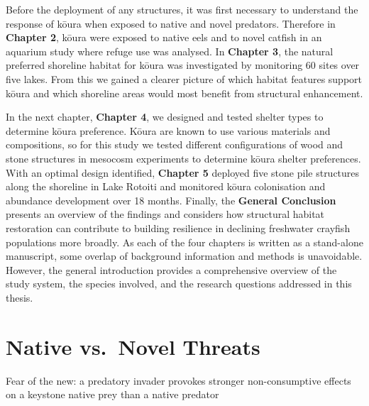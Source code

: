 \documentclass[
  12pt,
  a4paper,
  oneside]{scrbook}
\begin{document}
Before the deployment of any structures, it was first necessary to
understand the response of kōura when exposed to native and novel
predators. Therefore in \textbf{Chapter 2}, kōura were exposed to native
eels and to novel catfish in an aquarium study where refuge use was
analysed. In \textbf{Chapter 3}, the natural preferred shoreline habitat
for kōura was investigated by monitoring 60 sites over five lakes. From
this we gained a clearer picture of which habitat features support kōura
and which shoreline areas would most benefit from structural
enhancement.

In the next chapter, \textbf{Chapter 4}, we designed and tested shelter
types to determine kōura preference. Kōura are known to use various
materials and compositions, so for this study we tested different
configurations of wood and stone structures in mesocosm experiments to
determine kōura shelter preferences. With an optimal design identified,
\textbf{Chapter 5} deployed five stone pile structures along the
shoreline in Lake Rotoiti and monitored kōura colonisation and abundance
development over 18 months. Finally, the \textbf{General Conclusion}
presents an overview of the findings and considers how structural
habitat restoration can contribute to building resilience in declining
freshwater crayfish populations more broadly. As each of the four
chapters is written as a stand-alone manuscript, some overlap of
background information and methods is unavoidable. However, the general
introduction provides a comprehensive overview of the study system, the
species involved, and the research questions addressed in this thesis.


\chapter{Native vs.~Novel Threats}\label{native-vs.-novel-threats}

Fear of the new: a predatory invader provokes stronger non-consumptive
effects on a keystone native prey than a native predator
\end{document}

